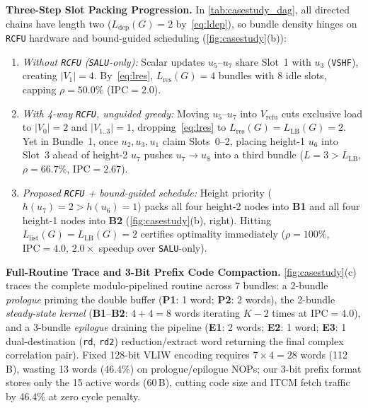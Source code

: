 \documentclass[9pt,conference]{IEEEtran}
\begin{document}
\textbf{Three-Step Slot Packing Progression.}
In \autoref{tab:casestudy_dag}, all directed chains have length two ($L_{\mathrm{dep}}(G) = 2$ by~\eqref{eq:ldep}), so bundle density hinges on \texttt{RCFU} hardware and bound-guided scheduling (\autoref{fig:casestudy}(b)):
\begin{enumerate}
    \item \textit{Without \texttt{RCFU} (\texttt{SALU}-only):} Scalar updates $u_5$--$u_7$ share Slot~1 with $u_3$ (\texttt{VSHF}), creating $|V_1| = 4$. By~\eqref{eq:lres}, $L_{\mathrm{res}}(G) = 4$ bundles with 8 idle slots, capping $\rho = 50.0\%$ ($\mathrm{IPC} = 2.0$).
    \item \textit{With 4-way \texttt{RCFU}, unguided greedy:} Moving $u_5$--$u_7$ into $V_{\mathrm{rcfu}}$ cuts exclusive load to $|V_0| = 2$ and $|V_{1..3}| = 1$, dropping~\eqref{eq:lres} to $L_{\mathrm{res}}(G) = L_{\mathrm{LB}}(G) = 2$. Yet in Bundle~1, once $u_2, u_3, u_1$ claim Slots~0--2, placing height-1 $u_6$ into Slot~3 ahead of height-2 $u_7$ pushes $u_7 \to u_8$ into a third bundle ($L = 3 > L_{\mathrm{LB}}$, $\rho = 66.7\%$, $\mathrm{IPC} = 2.67$).
    \item \textit{Proposed \texttt{RCFU} + bound-guided schedule:} Height priority ($h(u_7)=2 > h(u_6)=1$) packs all four height-2 nodes into \textbf{B1} and all four height-1 nodes into \textbf{B2} (\autoref{fig:casestudy}(b), right). Hitting $L_{\mathrm{list}}(G) = L_{\mathrm{LB}}(G) = 2$ certifies optimality immediately ($\rho = 100\%$, $\mathrm{IPC} = 4.0$, $2.0\times$ speedup over \texttt{SALU}-only).
\end{enumerate}

\textbf{Full-Routine Trace and 3-Bit Prefix Code Compaction.}
\autoref{fig:casestudy}(c) traces the complete modulo-pipelined routine across 7 bundles: a 2-bundle \textit{prologue} priming the double buffer (\textbf{P1}: 1 word; \textbf{P2}: 2 words), the 2-bundle \textit{steady-state kernel} (\textbf{B1}--\textbf{B2}: $4 + 4 = 8$ words iterating $K{-}2$ times at $\mathrm{IPC} = 4.0$), and a 3-bundle \textit{epilogue} draining the pipeline (\textbf{E1}: 2 words; \textbf{E2}: 1 word; \textbf{E3}: 1 dual-destination (\texttt{rd}, \texttt{rd2}) reduction/extract word returning the final complex correlation pair). Fixed 128-bit VLIW encoding requires $7 \times 4 = 28$ words (112\,B), wasting 13 words (46.4\%) on prologue/epilogue NOPs; our 3-bit prefix format stores only the 15 active words (60\,B), cutting code size and ITCM fetch traffic by 46.4\% at zero cycle penalty.
\end{document}
